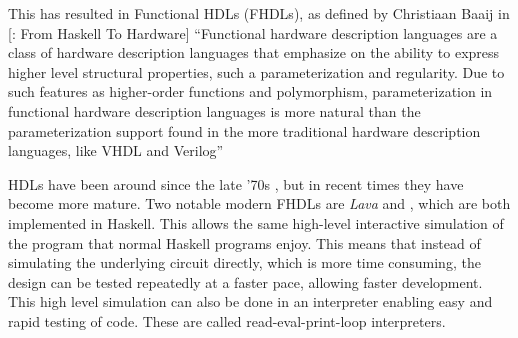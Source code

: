 		This has resulted in Functional HDLs (FHDLs), as defined by Christiaan 
		Baaij in [\clash: From Haskell To Hardware] ``Functional hardware
		description languages are a class of hardware description languages
		that emphasize on the ability to express higher level structural
		properties, such a parameterization and regularity. Due to such
		features as higher-order functions and polymorphism, parameterization
		in functional hardware description languages is more natural than the
		parameterization support found in the more traditional hardware
		description languages, like VHDL and Verilog'' \cite{Baaij2009}
		
		\label{FHDLs}
		HDLs have been around since the late '70s \cite{Chen2012}, but in
		recent times they have become more mature\cite{Chen2012}. Two notable
		modern FHDLs are \emph{Lava} and \clash \cite{Baaij2009, Bjesse1998},
		which are both implemented in Haskell. This allows the same
		high-level interactive simulation of the program that normal Haskell
		programs enjoy. This means that instead of simulating the underlying
		circuit directly, which is more time consuming, the design can be
		tested repeatedly at a faster pace, allowing faster development. This
		high level simulation can also be done in an interpreter enabling
		easy and rapid testing of code. These are called read-eval-print-loop
		interpreters\cite{repl}.
